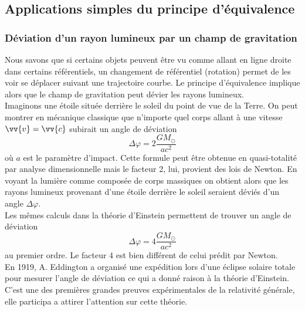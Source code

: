 \documentclass[a4paper,11pt]{report}
\theoremstyle{definition}
\theoremstyle{plain}
\theoremstyle{definition}
\theoremstyle{remark}
\begin{document}
        \subsection{Applications simples du principe d'équivalence}
        
            \subsubsection{Déviation d'un rayon lumineux par un champ de gravitation}
            
                Nous savons que si certains objets peuvent être vu comme allant en ligne droite dans certains référentiels, un changement de référentiel (rotation) permet de les voir se déplacer suivant une trajectoire courbe. Le principe d'équivalence implique alors que le champ de gravitation peut dévier les rayons lumineux.\\
                
                Imaginons une étoile située derrière le soleil du point de vue de la Terre. On peut montrer en mécanique classique que n'importe quel corps allant à une vitesse $\vv{v} = \vv{c}$ subirait un angle de déviation
                \begin{equation}
                    \Delta\varphi = 2\frac{GM_\odot}{ac^2}
                \end{equation}
                où $a$ est le paramètre d'impact. Cette formule peut être obtenue en quasi-totalité par analyse dimensionnelle mais le facteur 2, lui, provient des lois de Newton. En voyant la lumière comme composée de corps massiques on obtient alors que les rayons lumineux provenant d'une étoile derrière le soleil seraient déviés d'un angle $\Delta\varphi$.\\
                
                Les mêmes calculs dans la théorie d'Einstein permettent de trouver un angle de déviation
                \begin{equation}
                    \Delta\varphi = 4\frac{GM_\odot}{ac^2}
                \end{equation}
                au premier ordre. Le facteur $4$ est bien différent de celui prédit par Newton.\\
                
                En 1919, A. Eddington a organisé une expédition lors d'une éclipse solaire totale pour mesurer l'angle de déviation ce qui a donné raison à la théorie d'Einstein. C'est une des premières grandes preuves expérimentales de la relativité générale, elle participa a attirer l'attention sur cette théorie.
            
\end{document}
